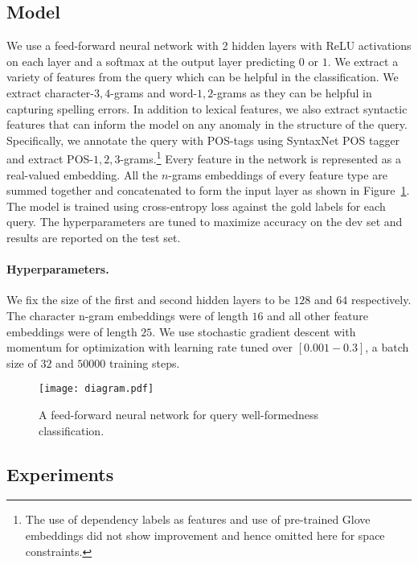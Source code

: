 \documentclass[11pt,a4paper]{article}
\begin{document}
\subsection{Model}
\label{sec:model}

We use a feed-forward neural network with 2 hidden layers
with ReLU activations \cite{relu} on each layer and a softmax at the output layer
predicting $0$ or $1$. 
We extract
a variety of features from the query which can be helpful in the classification. We
extract character-$3,4$-grams and word-$1,2$-grams as they can be helpful in capturing
spelling errors. In addition to lexical features, we also extract syntactic features that
can inform the model on any anomaly in the structure of the query. Specifically, we
annotate the query with POS-tags using SyntaxNet POS tagger
\cite{alberti-EtAl:2015:EMNLP} and extract POS-$1,2,3$-grams.\footnote{The use of dependency labels as features and use of pre-trained Glove embeddings
did not show improvement and hence omitted here for space constraints.}
Every feature in the network is represented as a real-valued embedding. All the $n$-grams
embeddings of every feature type are summed together and concatenated to form the input layer as shown in Figure~\ref{fig:model}.
The model is trained using cross-entropy loss against the gold labels for each
query. The hyperparameters are tuned to maximize accuracy
on the dev set and results are reported on the test set.

\paragraph{Hyperparameters.} 
We fix the size of the first and second hidden layers to be
$128$ and $64$ respectively. The character n-gram embeddings were of length $16$
and all other  feature embeddings were of length $25$. We use stochastic gradient
descent with momentum  for optimization with learning rate tuned over
$[0.001-0.3]$, a batch size of $32$ and $50000$ training steps.

\begin{figure}[!tb]
    \centering
    \texttt{[image: diagram.pdf]}
    \caption{A feed-forward neural network for query well-formedness classification.}
    \label{fig:model}
\end{figure}

\subsection{Experiments}
\end{document}
